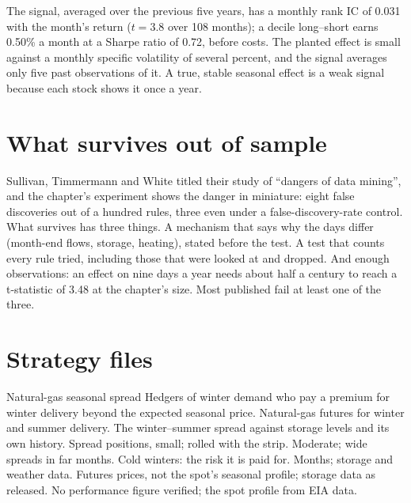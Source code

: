 The signal, averaged over the previous five years, has a monthly rank IC of 0.031 with the month's return ($t = 3.8$ over 108 months); a decile
long--short earns 0.50\% a month at a Sharpe ratio of 0.72, before costs. The planted effect is small against a monthly specific volatility of several
percent, and the signal averages only five past observations of it. A true, stable seasonal effect is a weak signal because each stock shows it once a year.

\section{What survives out of sample}

Sullivan, Timmermann and White titled their study of  ``dangers of data mining'', and the chapter's experiment shows the danger in
miniature: eight false discoveries out of a hundred rules, three even under a false-discovery-rate control. What survives has three things. A mechanism
that says why the days differ (month-end flows, storage, heating), stated before the test. A test that counts every rule tried, including those that
were looked at and dropped. And enough observations: an effect on nine days a year needs about half a century to reach a t-statistic of 3.48 at the
chapter's size. Most published  fail at least one of the three.

\section{Strategy files}

\begin{strategyfile}{Natural-gas seasonal spread}\label{strat:s1:seasonality-and-calendar-effects:gas}
 Hedgers of winter demand who pay a premium for winter delivery beyond the expected seasonal price.
 Natural-gas futures for winter and summer delivery.
 The winter--summer spread against storage levels and its own history.
 Spread positions, small; rolled with the strip.
 Moderate; wide spreads in far months.
 Cold winters: the risk it is paid for.
 Months; storage and weather data.
 Futures prices, not the spot's seasonal profile; storage data as released.
 No performance figure verified; the spot profile from EIA data.
\end{strategyfile}

